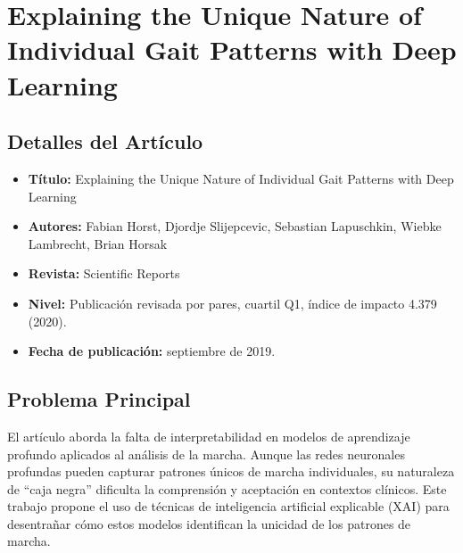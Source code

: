 \documentclass{report}
\begin{document}
    
    


\section{Explaining the Unique Nature of Individual Gait Patterns with Deep Learning}

\subsection{Detalles del Artículo}
\begin{itemize}
    \item \textbf{Título:} Explaining the Unique Nature of Individual Gait Patterns with Deep Learning
    \item \textbf{Autores:} Fabian Horst, Djordje Slijepcevic, Sebastian Lapuschkin, Wiebke Lambrecht, Brian Horsak
    \item \textbf{Revista:} Scientific Reports
    \item \textbf{Nivel:} Publicación revisada por pares, cuartil Q1, índice de impacto 4.379 (2020).
    \item \textbf{Fecha de publicación:} septiembre de 2019.
\end{itemize}

\subsection{Problema Principal}
El artículo aborda la falta de interpretabilidad en modelos de aprendizaje profundo aplicados al análisis de la marcha. Aunque las redes neuronales profundas pueden capturar patrones únicos de marcha individuales, su naturaleza de “caja negra” dificulta la comprensión y aceptación en contextos clínicos. Este trabajo propone el uso de técnicas de inteligencia artificial explicable (XAI) para desentrañar cómo estos modelos identifican la unicidad de los patrones de marcha.
\end{document}
